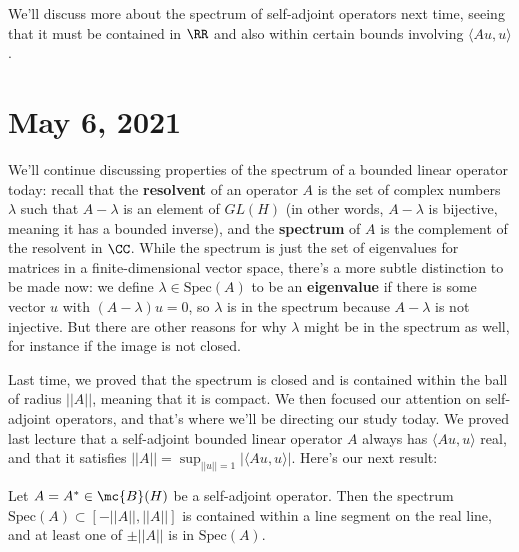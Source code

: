 We'll discuss more about the spectrum of self-adjoint operators next time, seeing that it must be contained in $\RR$ and also within certain bounds involving $\langle Au, u \rangle$. 


\pagebreak\section*{May 6, 2021}

We'll continue discussing properties of the spectrum of a bounded linear operator today: recall that the \textbf{resolvent} of an operator $A$ is the set of complex numbers $\lambda$ such that $A - \lambda$ is an element of $GL(H)$ (in other words, $A - \lambda$ is bijective, meaning it has a bounded inverse), and the \textbf{spectrum} of $A$ is the complement of the resolvent in $\CC$. While the spectrum is just the set of eigenvalues for matrices in a finite-dimensional vector space, there's a more subtle distinction to be made now: we define $\lambda \in \text{Spec}(A)$ to be an \textbf{eigenvalue} if there is some vector $u$ with $(A - \lambda)u = 0$, so $\lambda$ is in the spectrum because $A - \lambda$ is not injective. But there are other reasons for why $\lambda$ might be in the spectrum as well, for instance if the image is not closed. 

Last time, we proved that the spectrum is closed and is contained within the ball of radius $||A||$, meaning that it is compact. We then focused our attention on self-adjoint operators, and that's where we'll be directing our study today. We proved last lecture that a self-adjoint bounded linear operator $A$ always has $\langle Au, u \rangle$ real, and that it satisfies $||A|| = \sup_{||u|| = 1} |\langle Au, u \rangle|$. Here's our next result:

\begin{theorem}\label{spectrumisinrealline}
Let $A = A^\ast \in \mc{B}(H)$ be a self-adjoint operator. Then the spectrum $\text{Spec}(A) \subset [-||A||, ||A||]$ is contained within a line segment on the real line, and at least one of $\pm ||A||$ is in $\text{Spec}(A)$.
\end{theorem}

